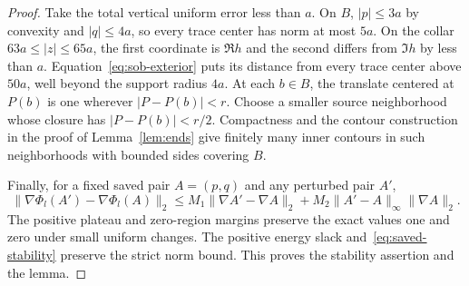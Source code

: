 \begin{proof}
Take the total vertical uniform error less than $a$.  On $B$,
$|p|\le3a$ by convexity and $|q|\le4a$, so every trace center has norm
at most $5a$.  On the collar $63a\le |z|\le65a$, the first coordinate
is $\Re h$ and the second differs from $\Im h$ by less than $a$.
Equation~\eqref{eq:sob-exterior} puts its distance from every trace
center above $50a$, well beyond the support radius $4a$.  At each
$b\in B$, the translate centered at $P(b)$ is one wherever
$|P-P(b)|<r$.  Choose a smaller source neighborhood whose closure has
$|P-P(b)|<r/2$.  Compactness and the contour construction in the proof
of Lemma~\ref{lem:ends} give finitely many inner contours in such
neighborhoods with bounded sides covering $B$.

Finally, for a fixed saved pair $A=(p,q)$ and any perturbed pair $A'$,
\begin{equation}\label{eq:saved-stability}
 \|\nabla\Phi_l(A')-\nabla\Phi_l(A)\|_2
 \le M_1\|\nabla A'-\nabla A\|_2
   +M_2\|A'-A\|_\infty\|\nabla A\|_2.
\end{equation}
The positive plateau and zero-region margins preserve the exact values
one and zero under small uniform changes.  The positive energy slack
and~\eqref{eq:saved-stability} preserve the strict norm bound.  This
proves the stability assertion and the lemma.
\end{proof}



